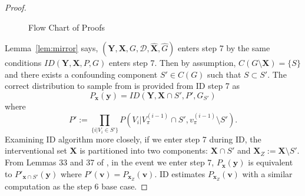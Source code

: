 \documentclass{article}
\newcommand{\x}{\mathbf{x}}
\newcommand{\y}{\mathbf{y}}
\newcommand{\X}{\mathbf{X}}
\newcommand{\Xp}{{\hat{\mathbf{X}}}}
\newcommand{\xp}{{\hat{\mathbf{x}}}}
\newcommand{\Gp}{{\hat{{G}}}}
\newcommand{\Y}{\mathbf{Y}}
\newcommand{\vb}{\mathbf{v}}
\newcommand{\data}{\mathcal{D}}
\newcommand{\idgen}{\text{ID-GEN}\xspace}
\newcommand{\idgenpar}{\idgen$(\mathbf{Y}, \mathbf{X},  G,  \data, {\Xp}, \Gp)$\xspace}
\theoremstyle{plain}
\theoremstyle{definition}
\theoremstyle{remark}
\begin{document}
\begin{proof}
\begin{figure}[t!]
    \caption{Flow Chart of Proofs}
\end{figure}
  
		
		Lemma~\ref{lem:mirror} says, \idgenpar enters step 7 by the same conditions $ID(\Y,\X, P, G)$ enters step 7. Then by assumption, $C(G\setminus \X)=\{S\}$ and there exists a confounding component $S'\in C(G)$ such that $S\subset S'$. The correct distribution to sample from is provided from ID step 7 as 
		\[
		P_{\x}(\y) = ID(\Y, \X\cap S', P', G_{S'})
		\]
		where 
		\[P' := \prod_{\{i|V_i\in S'\}} P(V_i| V_\pi^{(i-1)}\cap S', v_\pi^{(i-1)}\setminus S').\]
		Examining ID algorithm more closely, if we enter step 7 during ID, the interventional set $\X$ is partitioned into two components: $\X\cap S'$ and $\X_Z:=\X\setminus S'$. From Lemmas 33 and 37 of \citet{shpitser2008complete}, in the event we enter step 7, $P_{\x}(\y)$ is equivalent to $P'_{\x \cap S'}(\y)$ where $P'(\vb)=P_{\x_Z}(\vb)$. 
		ID estimates $P_{\x_Z}(\vb)$ with a similar computation as the step 6 base case.

  

\end{proof}
\end{document}
